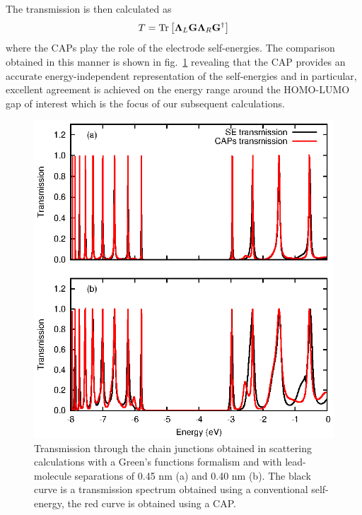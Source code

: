The transmission is then calculated as
\begin{equation}
  T = \mathop{\mathrm{Tr}}\nolimits \left[ \mathbf{\Lambda}_L \mathbf{G} \mathbf{\Lambda}_R \mathbf{G}^\dagger \right]
  \label{eq:transmfromG}
\end{equation}
where the \acp{CAP} play the role of the electrode self-energies.
The comparison obtained in this manner is shown in fig.~\ref{fig:transdat}
revealing that the \ac{CAP} provides an accurate energy-independent
representation of the self-energies and in particular, excellent agreement
is achieved on the energy range around the \ac{HOMO}-\ac{LUMO} gap of
interest which is the focus of our subsequent calculations.

\begin{figure} 
	\begin{center}
		\includegraphics[width=0.9\linewidth]{figures/figure2a_2b}
	\end{center}
	\caption{Transmission through the chain junctions obtained in
	         scattering calculations with a Green's functions formalism
		 and with lead-molecule separations of 0.45 nm (a) and 0.40
		 nm (b). The black curve is a transmission spectrum obtained
		 using a conventional self-energy, the red curve is
		 obtained using a \ac{CAP}.}
	\label{fig:transdat}
\end{figure}

